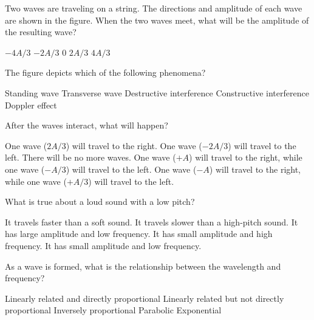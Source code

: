 \documentclass{../../../oss-ap12ibhl-print}
\begin{document}
\begin{questions}
  \question Two waves are traveling on a string. The directions and amplitude of
  each wave are shown in the figure. When the two waves meet, what will be the
  amplitude of the resulting wave?
  \label{des1}
  \begin{choices}
    \choice $-4A/3$
    \choice $-2A/3$
    \choice $0$
    \choice $2A/3$
    \choice $4A/3$
  \end{choices}
    
  \question The figure depicts which of the following phenomena?
  \begin{choices}
    \choice Standing wave
    \choice Transverse wave
    \choice Destructive interference
    \choice Constructive interference
    \choice Doppler effect
  \end{choices}
    
  \question After the waves interact, what will happen?
  \label{des2}
  \begin{choices}
    \choice One wave ($2A/3$) will travel to the right.
    \choice One wave ($-2A/3$) will travel to the left.
    \choice There will be no more waves.
    \choice One wave ($+A$) will travel to the right, while one wave ($-A/3$)
    will travel to the left.
    \choice One wave ($-A$) will travel to the right, while one wave ($+A/3$)
    will travel to the left.
  \end{choices}
    
  \question What is true about a loud sound with a low pitch?
  \begin{choices}
    \choice It travels faster than a soft sound.
    \choice It travels slower than a high-pitch sound.
    \choice It has large amplitude and low frequency.
    \choice It has small amplitude and high frequency.
    \choice It has small amplitude and low frequency.
  \end{choices}
    
  \question As a wave is formed, what is the relationship between the wavelength
  and frequency?
  \begin{choices}
    \choice Linearly related and directly proportional
    \choice Linearly related but not directly proportional
    \choice Inversely proportional
    \choice Parabolic
    \choice Exponential
  \end{choices}
    
    

\end{questions}
\end{document}
